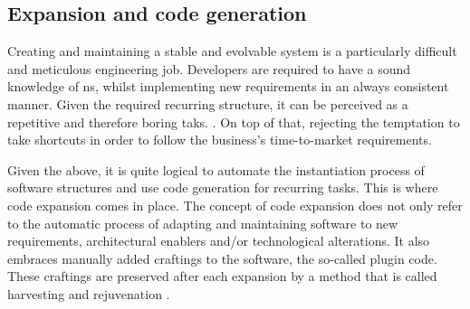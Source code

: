 \subsection{Expansion and code generation} \label{subsec:expansion}

Creating and maintaining a stable and evolvable system is a particularly difficult and
meticulous engineering job. Developers are required to have a sound knowledge of \gls{ns},
whilst implementing new requirements in an always consistent manner. Given the required
recurring structure, it can be perceived as a repetitive and therefore boring taks.
\parencite[219]{mannaert_normalized_2016}. On top of that, rejecting the temptation to
take shortcuts in order to follow the business's time-to-market requirements.

Given the above, it is quite logical to automate the instantiation process of software
structures and use code generation for recurring
tasks\parencite[403]{mannaert_normalized_2016}. This is where code expansion comes in
place. The concept of code expansion does not only refer to the automatic process of
adapting and maintaining software to new requirements, architectural enablers and/or
technological alterations. It also embraces manually added craftings to the software, the
so-called plugin code. These craftings are preserved after each expansion by a method that
is called harvesting and rejuvenation \parencite[405-406]{mannaert_normalized_2016}.

